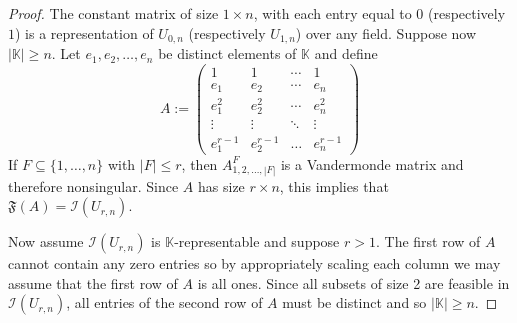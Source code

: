 \documentclass[10pt,a4paper]{amsart}
\begin{document}
\begin{proof}
    The constant matrix of size $1\times n$, with each entry equal to $0$ (respectively $1$) is a representation of $U_{0,n}$ (respectively $U_{1,n}$) over any field.
    Suppose now $|\mathbb{K}| \geq n$.
    Let $e_1, e_2, \dots, e_n$ be distinct elements of $\mathbb{K}$ and define 
    \begin{equation*}
        A := \begin{pmatrix}
            1 & 1 & \cdots & 1 \\
            e_1 & e_2 & \cdots & e_n \\
            e_1^2 & e_2^2 & \cdots & e_n^2 \\
            \vdots & \vdots & \ddots & \vdots \\
            e_1^{r-1} & e_2^{r-1} & \dots & e_n^{r-1}
        \end{pmatrix}
    \end{equation*}
    If $F \subseteq \{1,\dots,n\}$ with $|F| \le r$,
    then $A_{1, 2, \dots, |F|}^F$ is a Vandermonde matrix and therefore nonsingular.
    Since $A$ has size $r\times n$, this implies that $\mathfrak{F}(A) = \mathcal{I}(U_{r,n})$.

    Now assume $\mathcal{I}(U_{r,n})$ is $\mathbb{K}$-representable and suppose $r > 1$.
    The first row of $A$ cannot contain any zero entries
    so by appropriately scaling each column we may assume that the first row of $A$ is all ones.
    Since all subsets of size 2 are feasible in $\mathcal{I}(U_{r,n})$,
    all entries of the second row of $A$ must be distinct and so $|\mathbb{K}| \ge n$.
\end{proof}
\end{document}

